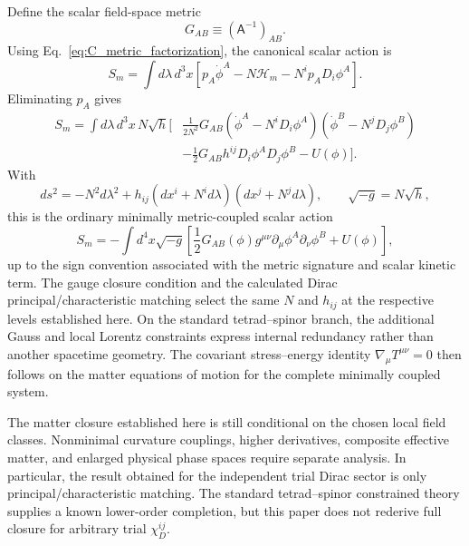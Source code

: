 \documentclass[11pt]{article}
\begin{document}
Define the scalar field-space metric
\begin{equation}
    G_{AB}\equiv(\mathsf A^{-1})_{AB}.
\end{equation}
Using Eq.~\eqref{eq:C_metric_factorization}, the canonical scalar action is
\begin{equation}
    S_m=\int d\lambda\,d^3x
    \left[p_A\dot\phi^A-N\mathcal H_m-N^ip_AD_i\phi^A\right].
\end{equation}
Eliminating $p_A$ gives
\begin{equation}
\begin{aligned}
S_m=\int d\lambda\,d^3x\,N\sqrt h\Bigg[&
\frac{1}{2N^2}G_{AB}
(\dot\phi^A-N^iD_i\phi^A)
(\dot\phi^B-N^jD_j\phi^B)\\
&-\frac12G_{AB}h^{ij}D_i\phi^A D_j\phi^B-U(\phi)
\Bigg].
\end{aligned}
\label{eq:matter_ADM_action}
\end{equation}
With
\begin{equation}
    ds^2=-N^2d\lambda^2
    +h_{ij}(dx^i+N^id\lambda)(dx^j+N^jd\lambda),
    \qquad \sqrt{-g}=N\sqrt h,
\end{equation}
this is the ordinary minimally metric-coupled scalar action
\begin{equation}
\boxed{
S_m=-\int d^4x\sqrt{-g}
\left[
\frac12G_{AB}(\phi)g^{\mu\nu}
\partial_\mu\phi^A\partial_\nu\phi^B+U(\phi)
\right],}
\label{eq:reconstructed_covariant_matter}
\end{equation}
up to the sign convention associated with the metric signature and scalar kinetic term. The gauge closure condition and the calculated Dirac principal/characteristic matching select the same $N$ and $h_{ij}$ at the respective levels established here. On the standard tetrad--spinor branch, the additional Gauss and local Lorentz constraints express internal redundancy rather than another spacetime geometry. The covariant stress--energy identity $\nabla_\mu T^{\mu\nu}=0$ then follows on the matter equations of motion for the complete minimally coupled system.

The matter closure established here is still conditional on the chosen local field classes. Nonminimal curvature couplings, higher derivatives, composite effective matter, and enlarged physical phase spaces require separate analysis. In particular, the result obtained for the independent trial Dirac sector is only principal/characteristic matching. The standard tetrad--spinor constrained theory supplies a known lower-order completion, but this paper does not rederive full closure for arbitrary trial $\chi_D^{ij}$.
\end{document}
